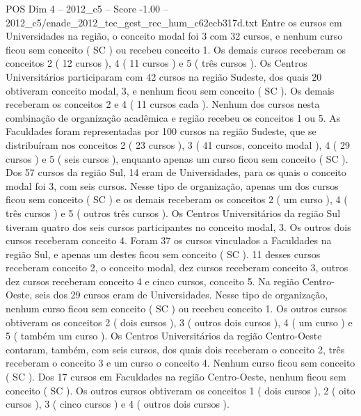 \begin{textsample}{POS Dim 4 – 2012\_c5 – Score -1.00 – 2012\_c5/enade\_2012\_tec\_gest\_rec\_hum\_c62ecb317d.txt}
Entre os cursos em Universidades na região, o conceito modal foi 3 com 32 cursos, e nenhum curso ficou sem conceito ( SC ) ou recebeu conceito 1.
Os demais cursos receberam os conceitos 2 ( 12 cursos ), 4 ( 11 cursos ) e 5 ( três cursos ).
Os Centros Universitários participaram com 42 cursos na região Sudeste, dos quais 20 obtiveram conceito modal, 3, e nenhum ficou sem conceito ( SC ).
Os demais receberam os conceitos 2 e 4 ( 11 cursos cada ).
Nenhum dos cursos nesta combinação de organização acadêmica e região recebeu os conceitos 1 ou 5.
As Faculdades foram representadas por 100 cursos na região Sudeste, que se distribuíram nos conceitos 2 ( 23 cursos ), 3 ( 41 cursos, conceito modal ), 4 ( 29 cursos ) e 5 ( seis cursos ), enquanto apenas um curso ficou sem conceito ( SC ).
Dos 57 cursos da região Sul, 14 eram de Universidades, para os quais o conceito modal foi 3, com seis cursos.
Nesse tipo de organização, apenas um dos cursos ficou sem conceito ( SC ) e os demais receberam os conceitos 2 ( um curso ), 4 ( três cursos ) e 5 ( outros três cursos ).
Os Centros Universitários da região Sul tiveram quatro dos seis cursos participantes no conceito modal, 3.
Os outros dois cursos receberam conceito 4.
Foram 37 os cursos vinculados a Faculdades na região Sul, e apenas um destes ficou sem conceito ( SC ). 11 desses cursos receberam conceito 2, o conceito modal, dez cursos receberam conceito 3, outros dez cursos receberam conceito 4 e cinco cursos, conceito 5.
Na região Centro-Oeste, seis dos 29 cursos eram de Universidades.
Nesse tipo de organização, nenhum curso ficou sem conceito ( SC ) ou recebeu conceito 1.
Os outros cursos obtiveram os conceitos 2 ( dois cursos ), 3 ( outros dois cursos ), 4 ( um curso ) e 5 ( também um curso ).
Os Centros Universitários da região Centro-Oeste contaram, também, com seis cursos, dos quais dois receberam o conceito 2, três receberam o conceito 3 e um curso o conceito 4.
Nenhum curso ficou sem conceito ( SC ).
Dos 17 cursos em Faculdades na região Centro-Oeste, nenhum ficou sem conceito ( SC ).
Os outros cursos obtiveram os conceitos 1 ( dois cursos ), 2 ( oito cursos ), 3 ( cinco cursos ) e 4 ( outros dois cursos ).

\end{textsample}
